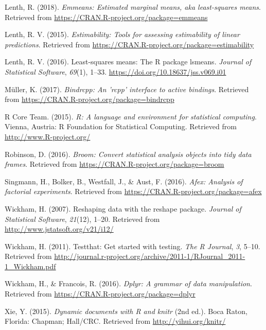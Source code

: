 \documentclass[
  man,floatsintext]{apa6}
\newlength{\cslhangindent}
\newlength{\cslentryspacingunit} %
\newenvironment{CSLReferences}[2] %
 {%
  \setlength{\parindent}{0pt}
  \ifodd #1
  \let\oldpar\par
  \def\par{\hangindent=\cslhangindent\oldpar}
  \fi
  \setlength{\parskip}{#2\cslentryspacingunit}
 }%
 {}
\begin{document}
\begin{CSLReferences}{1}{0}
\leavevmode{}%
Lenth, R. (2018). \emph{Emmeans: Estimated marginal means, aka least-squares means}. Retrieved from \url{https://CRAN.R-project.org/package=emmeans}

\leavevmode{}%
Lenth, R. V. (2015). \emph{Estimability: Tools for assessing estimability of linear predictions}. Retrieved from \url{https://CRAN.R-project.org/package=estimability}

\leavevmode{}%
Lenth, R. V. (2016). Least-squares means: The {R} package {lsmeans}. \emph{Journal of Statistical Software}, \emph{69}(1), 1--33. \url{https://doi.org/10.18637/jss.v069.i01}

\leavevmode{}%
Müller, K. (2017). \emph{Bindrcpp: An 'rcpp' interface to active bindings}. Retrieved from \url{https://CRAN.R-project.org/package=bindrcpp}

\leavevmode{}%
R Core Team. (2015). \emph{R: A language and environment for statistical computing}. Vienna, Austria: R Foundation for Statistical Computing. Retrieved from \url{http://www.R-project.org/}

\leavevmode{}%
Robinson, D. (2016). \emph{Broom: Convert statistical analysis objects into tidy data frames}. Retrieved from \url{https://CRAN.R-project.org/package=broom}

\leavevmode{}%
Singmann, H., Bolker, B., Westfall, J., \& Aust, F. (2016). \emph{Afex: Analysis of factorial experiments}. Retrieved from \url{https://CRAN.R-project.org/package=afex}

\leavevmode{}%
Wickham, H. (2007). Reshaping data with the {reshape} package. \emph{Journal of Statistical Software}, \emph{21}(12), 1--20. Retrieved from \url{http://www.jstatsoft.org/v21/i12/}

\leavevmode{}%
Wickham, H. (2011). Testthat: Get started with testing. \emph{The R Journal}, \emph{3}, 5--10. Retrieved from \url{http://journal.r-project.org/archive/2011-1/RJournal_2011-1_Wickham.pdf}

\leavevmode{}%
Wickham, H., \& Francois, R. (2016). \emph{Dplyr: A grammar of data manipulation}. Retrieved from \url{https://CRAN.R-project.org/package=dplyr}

\leavevmode{}%
Xie, Y. (2015). \emph{Dynamic documents with {R} and knitr} (2nd ed.). Boca Raton, Florida: Chapman; Hall/CRC. Retrieved from \url{http://yihui.org/knitr/}

\end{CSLReferences}
\end{document}
